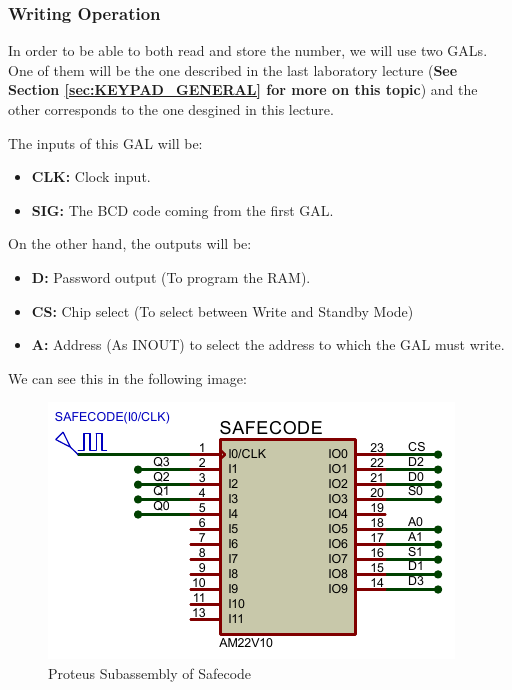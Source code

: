 \subsubsection{Writing Operation}
\label{sec:WRITING_OPERATION}

In order to be able to both read and store the number, we will use two GALs. One of them will be the one described in the last laboratory lecture (\textbf{See Section \ref{sec:KEYPAD_GENERAL} for more on this topic}) and the other corresponds to the one desgined in this lecture. 

The inputs of this GAL will be:

\begin{itemize}
    \item \textbf{CLK:} Clock input.
    \item \textbf{SIG:} The BCD code coming from the first GAL.
\end{itemize}

On the other hand, the outputs will be:

\begin{itemize}
    \item \textbf{D:} Password output (To program the RAM).
    \item \textbf{CS:} Chip select (To select between Write and Standby Mode)
    \item \textbf{A:} Address (As INOUT) to select the address to which the GAL must write.
\end{itemize}

We can see this in the following image:

\begin{figure}[H]
    \centering
    \includegraphics[scale = 1.15]{Graphics/Practice 6/SAFECODE/SAFECODE_PROTEUS_GAL.PDF}
    \caption{Proteus Subassembly of Safecode}
    \label{fig:SAFECODE_PROTEUS}
\end{figure}

